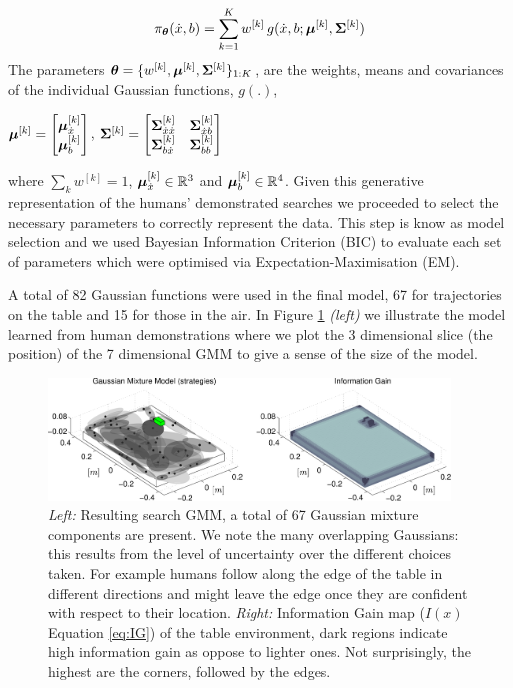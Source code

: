 \begin{equation} \label{eq:gmm2}
 \pi_{\boldsymbol{\theta}}(\dot{x},b) = \sum\limits_{k=1}^{K} w^{[k]} \, g(\dot{x},b;\boldsymbol{\mu}^{[k]},\boldsymbol{\Sigma}^{[k]}) 
\end{equation}
The parameters $\boldsymbol{\theta} = \{w^{[k]},\boldsymbol{\mu}^{[k]},\boldsymbol{\Sigma}^{[k]}\}_{1:K}$, are the weights, means and covariances 
of the individual Gaussian functions, $g(.)$,
\begin{center}
$\boldsymbol{\mu}^{[k]} =  \begin{bmatrix} \boldsymbol{\mu}^{[k]}_{\dot{x}} \\ \boldsymbol{\mu}^{[k]}_{b} \end{bmatrix}$, 
$\boldsymbol{\Sigma}^{[k]} =  \begin{bmatrix} 
	  \boldsymbol{\Sigma}^{[k]}_{\dot{x}\dot{x}} & \boldsymbol{\Sigma}^{[k]}_{\dot{x}b} \\
	  \boldsymbol{\Sigma}^{[k]}_{b\dot{x}} & \boldsymbol{\Sigma}^{[k]}_{bb}
	  \end{bmatrix}$
\end{center}
where $\sum_{k} w^{[k]} = 1$, $\boldsymbol{\mu}^{[k]}_{\dot{x}} \in \mathbb{R}^{3}$ and  $\boldsymbol{\mu}^{[k]}_{b} \in \mathbb{R}^{4}$. Given this generative representation of the humans' demonstrated searches we proceeded to 
select the necessary parameters to correctly represent the data. This step is know as model selection and we used Bayesian Information Criterion (BIC) to evaluate
each set of parameters which were optimised via Expectation-Maximisation (EM). 

A total of 82 Gaussian functions were used in the final model, 67 for trajectories on the table and 15 for those in the air. In Figure
\ref{fig:gmm} \textit{(left)} we illustrate the model learned from human demonstrations where we plot the 3 dimensional slice (the position) of the 7
dimensional GMM to give a sense of the size of the model.

\begin{figure}
\centering
  \includegraphics[width=0.95\textwidth]{./ch3-Search/Figures/Figure4}
  \caption{\textit{Left: } Resulting search GMM, a total of 67 Gaussian mixture components are present. We note the many overlapping Gaussians: this results
from the level of uncertainty over the different choices taken. For example humans follow along the edge of the table in different directions and might
leave the edge once they are confident with respect to their location. \textit{Right:} Information Gain map ($I(x)$ Equation \ref{eq:IG}) of the table environment, dark regions indicate 
high information gain as oppose to lighter ones. Not surprisingly, the highest are the corners, followed by the edges.}
  \label{fig:gmm}
\end{figure}

